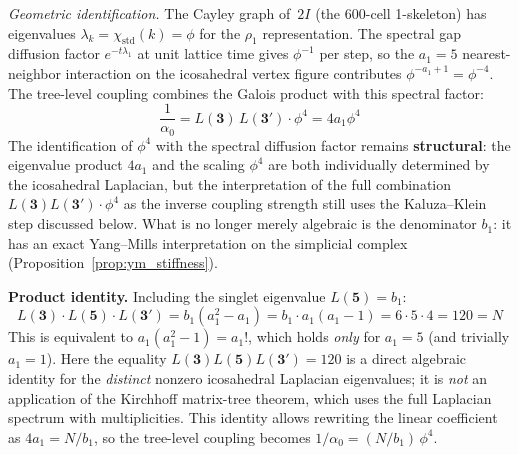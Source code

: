 \documentclass[12pt,a4paper]{article}
\theoremstyle{definition}
\begin{document}
\noindent\textit{Geometric identification.}  The Cayley graph of~$2I$ (the 600-cell 1-skeleton) has eigenvalues $\lambda_k = \chi_{\text{std}}(k) = \phi$ for the $\rho_1$ representation.  The spectral gap diffusion factor $e^{-t\lambda_1}$ at unit lattice time gives $\phi^{-1}$ per step, so the $a_1 = 5$ nearest-neighbor interaction on the icosahedral vertex figure contributes $\phi^{-a_1+1} = \phi^{-4}$.  The tree-level coupling combines the Galois product with this spectral factor:
\begin{equation}
\frac{1}{\alpha_0} = L(\mathbf{3})\,L(\mathbf{3'}) \cdot \phi^4 = 4a_1\phi^4
\label{eq:alpha0}
\end{equation}
The identification of $\phi^4$ with the spectral diffusion factor remains \textbf{structural}: the eigenvalue product $4a_1$ and the scaling $\phi^4$ are both individually determined by the icosahedral Laplacian, but the interpretation of the full combination $L(\mathbf{3})L(\mathbf{3'})\cdot\phi^4$ as the inverse coupling strength still uses the Kaluza--Klein step discussed below.  What is no longer merely algebraic is the denominator $b_1$: it has an exact Yang--Mills interpretation on the simplicial complex (Proposition~\ref{prop:ym_stiffness}).

\textbf{Product identity.}  Including the singlet eigenvalue $L(\mathbf{5}) = b_1$:
\begin{equation}
L(\mathbf{3}) \cdot L(\mathbf{5}) \cdot L(\mathbf{3'}) = b_1(a_1^2 - a_1) = b_1 \cdot a_1(a_1-1) = 6 \cdot 5 \cdot 4 = 120 = N
\label{eq:product_identity}
\end{equation}
This is equivalent to $a_1(a_1^2 - 1) = a_1!$, which holds \emph{only} for $a_1 = 5$ (and trivially $a_1 = 1$).  Here the equality $L(\mathbf{3})L(\mathbf{5})L(\mathbf{3'}) = 120$ is a direct algebraic identity for the \emph{distinct} nonzero icosahedral Laplacian eigenvalues; it is \emph{not} an application of the Kirchhoff matrix-tree theorem, which uses the full Laplacian spectrum with multiplicities.  This identity allows rewriting the linear coefficient as $4a_1 = N/b_1$, so the tree-level coupling becomes $1/\alpha_0 = (N/b_1)\,\phi^4$.
\end{document}
